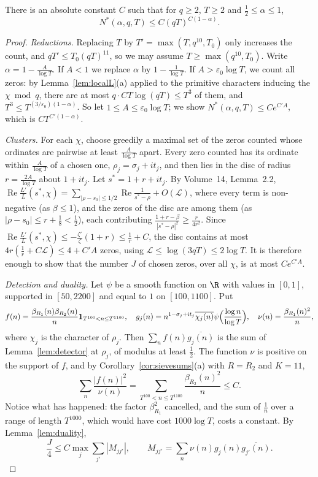\begin{theorem}\label{thm:logfree}
There is an absolute constant $C$ such that for $q\ge2$, $T\ge2$ and $\frac12\le\alpha\le1$,
\[
N^*(\alpha,q,T)\le C(qT)^{C(1-\alpha)}.
\]
\end{theorem}
\begin{proof}
\emph{Reductions.} Replacing $T$ by $T'=\max(T,q^{10},T_0)$ only increases the count, and $qT'\le T_0(qT)^{11}$, so we may assume $T\ge\max(q^{10},T_0)$. Write $\alpha=1-\frac A{\log T}$. If $A<1$ we replace $\alpha$ by $1-\frac1{\log T}$. If $A>\varepsilon_0\log T$, we count all zeros: by Lemma~\ref{lem:localL}(a) applied to the primitive characters inducing the $\chi\bmod q$, there are at most $q\cdot CT\log(qT)\le T^3$ of them, and $T^3\le T^{(3/\varepsilon_0)(1-\alpha)}$. So let $1\le A\le\varepsilon_0\log T$; we show $N^*(\alpha,q,T)\le Ce^{C'A}$, which is $CT^{C'(1-\alpha)}$.

\emph{Clusters.} For each $\chi$, choose greedily a maximal set of the zeros counted whose ordinates are pairwise at least $\frac A{\log T}$ apart. Every zero counted has its ordinate within $\frac A{\log T}$ of a chosen one, $\rho_j=\sigma_j+it_j$, and then lies in the disc of radius $r=\frac{2A}{\log T}$ about $1+it_j$. Let $s^*=1+r+it_j$. By Volume~14, Lemma~2.2, $\operatorname{Re}\frac{L'}L(s^*,\chi)=\sum_{|\rho-s_0|\le1/2}\operatorname{Re}\frac1{s^*-\rho}+O(\mathcal L)$, where every term is non-negative (as $\beta\le1$), and the zeros of the disc are among them (as $|\rho-s_0|\le r+\frac18<\frac12$), each contributing $\frac{1+r-\beta}{|s^*-\rho|^2}\ge\frac r{4r^2}$. Since $\operatorname{Re}\frac{L'}L(s^*,\chi)\le-\frac{\zeta'}\zeta(1+r)\le\frac1r+C$, the disc contains at most $4r(\frac1r+C\mathcal L)\le4+C'A$ zeros, using $\mathcal L\le\log(3qT)\le2\log T$. It is therefore enough to show that the number $J$ of chosen zeros, over all $\chi$, is at most $Ce^{C'A}$.

\emph{Detection and duality.} Let $\psi$ be a smooth function on $\R$ with values in $[0,1]$, supported in $[50,2200]$ and equal to $1$ on $[100,1100]$. Put
\[
f(n)=\frac{\beta_{R_1}(n)\beta_{R_2}(n)}n\mathbf 1_{T^{100}<n\le T^{1100}},\quad g_j(n)=n^{1-\sigma_j+it_j}\overline{\chi_j(n)}\psi\Bigl(\frac{\log n}{\log T}\Bigr),\quad\nu(n)=\frac{\beta_{R_1}(n)^2}n,
\]
where $\chi_j$ is the character of $\rho_j$. Then $\sum_nf(n)\overline{g_j(n)}$ is the sum of Lemma~\ref{lem:detector} at $\rho_j$, of modulus at least $\frac12$. The function $\nu$ is positive on the support of $f$, and by Corollary~\ref{cor:sievesums}(a) with $R=R_2$ and $K=11$,
\[
\sum_n\frac{|f(n)|^2}{\nu(n)}=\sum_{T^{100}<n\le T^{1100}}\frac{\beta_{R_2}(n)^2}n\le C.
\]
Notice what has happened: the factor $\beta_{R_1}^2$ cancelled, and the sum of $\frac1n$ over a range of length $T^{1000}$, which would have cost $1000\log T$, costs a constant. By Lemma~\ref{lem:duality},
\[
\frac J4\le C\max_j\sum_{j'}|M_{jj'}|,\qquad M_{jj'}=\sum_n\nu(n)g_j(n)\overline{g_{j'}(n)}.
\]


\end{proof}
